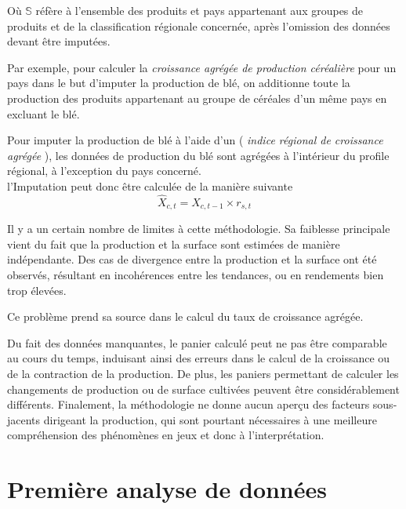 \documentclass[nojss]{jss}\usepackage{graphicx, color}
\begin{document}
Où $\mathbb{S}$ r\'{e}f\`{e}re \`{a} l'ensemble des produits et pays
appartenant aux groupes de produits et de la classification
r\'{e}gionale concern\'{e}e, apr\`{e}s l'omission des donn\'{e}es
devant être imput\'{e}es.


Par exemple, pour calculer la \textit{croissance agr\'{e}g\'{e}e de
  production c\'{e}r\'{e}ali\`{e}re} pour un pays dans le but
  d'imputer la production de bl\'{e}, on additionne toute la
  production des produits appartenant au groupe de c\'{e}r\'{e}ales
  d'un même pays en excluant le bl\'{e}.

Pour imputer la production de bl\'{e} \`{a} l'aide d'un (\textit{
  indice r\'{e}gional de croissance agr\'{e}g\'{e}e }), les
donn\'{e}es de production du bl\'{e} sont agr\'{e}g\'{e}es \`{a}
l'int\'{e}rieur du profile r\'{e}gional, \`{a} l'exception du pays
concern\'{e}. \\


l'Imputation peut donc être calcul\'{e}e de la mani\`{e}re suivante
\begin{equation}
  \hat{X}_{c, t} = X_{c, t-1} \times r_{s, t}
\end{equation}
  
Il y a un certain nombre de limites \`{a} cette m\'{e}thodologie. Sa
faiblesse principale vient du fait que la production et la surface
sont estim\'{e}es de mani\`{e}re ind\'{e}pendante. Des cas de
divergence entre la production et la surface ont \'{e}t\'{e}
observ\'{e}s, r\'{e}sultant en incoh\'{e}rences entre les tendances,
ou en rendements bien trop \'{e}lev\'{e}es.


Ce probl\`{e}me prend sa source dans le calcul du taux de croissance
agr\'{e}g\'{e}e.

Du fait des donn\'{e}es manquantes, le panier calcul\'{e} peut ne pas
\^{e}tre comparable au cours du temps, induisant ainsi des erreurs dans le
calcul de la croissance ou de la contraction de la production. De
plus, les paniers permettant de calculer les changements de production
ou de surface cultiv\'{e}es peuvent \^{e}tre consid\'{e}rablement
diff\'{e}rents. Finalement, la m\'{e}thodologie ne donne aucun aper\c{c}u
des facteurs sous-jacents dirigeant la production, qui sont pourtant
n\'{e}cessaires \`{a} une meilleure compr\'{e}hension des
ph\'{e}nom\`{e}nes en jeux et donc \`{a} l'interpr\'{e}tation.


\section{Premi\`{e}re analyse de donn\'{e}es}
\end{document}
